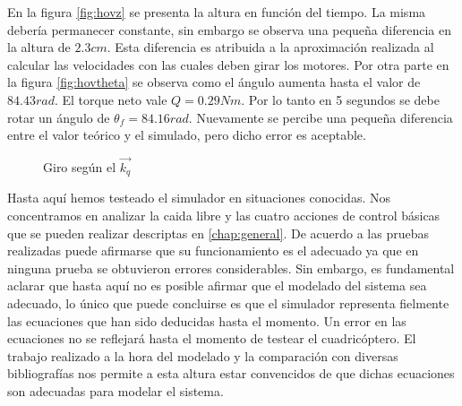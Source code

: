 \documentclass[main]{subfiles}
\begin{document}
En la figura \ref{fig:hovz} se presenta la altura en funci\'on del tiempo. La misma deber\'ia permanecer constante, sin embargo se observa una peque\~na diferencia en la altura de $2.3cm$. Esta diferencia es atribuida a la aproximaci\'on realizada al calcular las velocidades con las cuales deben girar los motores. Por otra parte en la figura \ref{fig:hovtheta} se observa como el \'angulo aumenta hasta el valor de $84.43 rad$. El torque neto vale $Q = 0.29Nm $. Por lo tanto en 5 segundos se debe rotar un \'angulo de $\theta_f=84.16rad$. Nuevamente se percibe una peque\~na diferencia entre el valor te\'orico y el simulado, pero dicho error es aceptable. 

\begin{figure} [h!]
  \centering
  \caption{Giro seg\'un el $\vec{k_q}$}
  \label{fig:hov}
\end{figure}

Hasta aqu\'i hemos testeado el simulador en situaciones conocidas. Nos concentramos en analizar la caida libre y las cuatro acciones de control b\'asicas que se pueden realizar descriptas en \ref{chap:general}. De acuerdo a las pruebas realizadas puede afirmarse que su funcionamiento es el adecuado ya que en ninguna prueba se obtuvieron errores considerables. Sin embargo, es fundamental aclarar que hasta aqu\'i no es posible afirmar que el modelado del sistema sea adecuado, lo \'unico que puede concluirse es que el simulador representa fielmente las ecuaciones que han sido deducidas hasta el momento. Un error en las ecuaciones no se reflejar\'a hasta el momento de testear el cuadric\'optero. El trabajo realizado a la hora del modelado y la comparaci\'on con diversas bibliograf\'ias nos permite a esta altura estar convencidos de que dichas ecuaciones son adecuadas para modelar el sistema.
\end{document}

